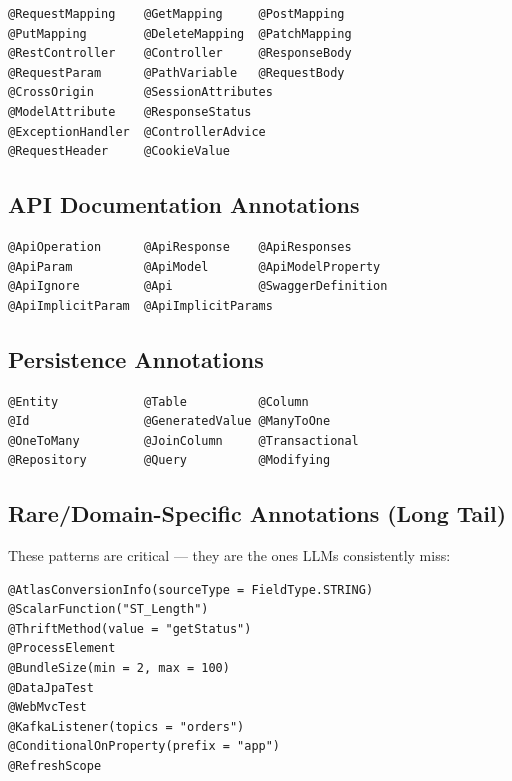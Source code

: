 \documentclass[acmlarge,nonacm,screen]{acmart}
\begin{document}
\begin{lstlisting}[language={},caption={Most common web annotation prefixes (each prefix corresponds to many full patterns)}]
@RequestMapping    @GetMapping     @PostMapping
@PutMapping        @DeleteMapping  @PatchMapping
@RestController    @Controller     @ResponseBody
@RequestParam      @PathVariable   @RequestBody
@CrossOrigin       @SessionAttributes
@ModelAttribute    @ResponseStatus
@ExceptionHandler  @ControllerAdvice
@RequestHeader     @CookieValue
\end{lstlisting}

\subsection{API Documentation Annotations}

\begin{lstlisting}[language={},caption={Swagger/OpenAPI annotation prefixes}]
@ApiOperation      @ApiResponse    @ApiResponses
@ApiParam          @ApiModel       @ApiModelProperty
@ApiIgnore         @Api            @SwaggerDefinition
@ApiImplicitParam  @ApiImplicitParams
\end{lstlisting}

\subsection{Persistence Annotations}

\begin{lstlisting}[language={},caption={JPA/Hibernate annotation prefixes}]
@Entity            @Table          @Column
@Id                @GeneratedValue @ManyToOne
@OneToMany         @JoinColumn     @Transactional
@Repository        @Query          @Modifying
\end{lstlisting}

\subsection{Rare/Domain-Specific Annotations (Long Tail)}

These patterns are critical --- they are the ones LLMs consistently miss:

\begin{lstlisting}[language={},caption={Rare annotations that LLMs cannot recall}]
@AtlasConversionInfo(sourceType = FieldType.STRING)
@ScalarFunction("ST_Length")
@ThriftMethod(value = "getStatus")
@ProcessElement
@BundleSize(min = 2, max = 100)
@DataJpaTest
@WebMvcTest
@KafkaListener(topics = "orders")
@ConditionalOnProperty(prefix = "app")
@RefreshScope
\end{lstlisting}
\end{document}
